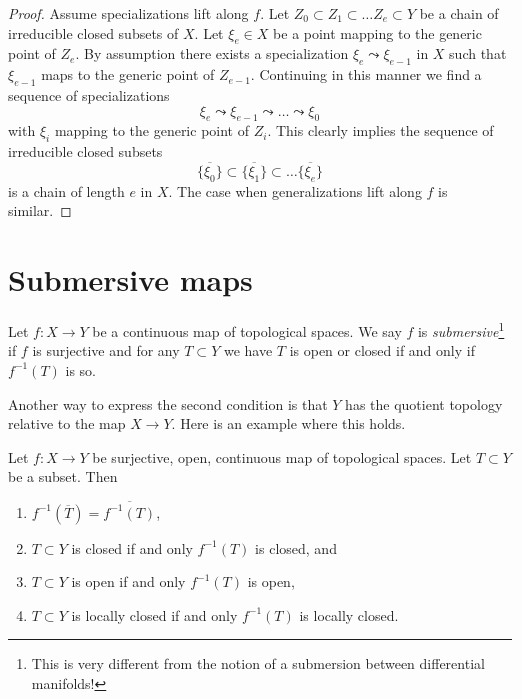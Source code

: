 \begin{proof}
Assume specializations lift along $f$.
Let $Z_0 \subset Z_1 \subset \ldots Z_e \subset Y$ be a chain
of irreducible closed subsets of $X$. Let $\xi_e \in X$ be a point
mapping to the generic point of $Z_e$. By assumption there
exists a specialization
$\xi_e \leadsto \xi_{e - 1}$ in $X$ such that $\xi_{e - 1}$ maps to
the generic point of $Z_{e - 1}$. Continuing in this manner we find
a sequence of specializations
$$
\xi_e \leadsto \xi_{e - 1} \leadsto \ldots \leadsto \xi_0
$$
with $\xi_i$ mapping to the generic point of $Z_i$.
This clearly implies the sequence of irreducible closed
subsets
$$
\overline{\{\xi_0\}} \subset
\overline{\{\xi_1\}} \subset \ldots
\overline{\{\xi_e\}}
$$
is a chain of length $e$ in $X$.
The case when generalizations lift along $f$ is similar.
\end{proof}





\section{Submersive maps}
\label{section-submersive}


\begin{definition}
\label{definition-submersive}
Let $f : X \to Y$ be a continuous map of topological spaces.
We say $f$ is {\it submersive}\footnote{This is very different from
the notion of a submersion between differential manifolds!}
if $f$ is surjective and for any $T \subset Y$ we have $T$ is
open or closed if and only if $f^{-1}(T)$ is so.
\end{definition}

\noindent
Another way to express the second condition is that $Y$ has the
quotient topology relative to the map $X \to Y$. Here is an example
where this holds.

\begin{lemma}
\label{lemma-open-morphism-quotient-topology}
Let $f : X \to Y$ be surjective, open, continuous map of topological spaces.
Let $T \subset Y$ be a subset. Then
\begin{enumerate}
\item $f^{-1}(\overline{T}) = \overline{f^{-1}(T)}$,
\item $T \subset Y$ is closed if and only $f^{-1}(T)$ is closed, and
\item $T \subset Y$ is open if and only $f^{-1}(T)$ is open,
\item $T \subset Y$ is locally closed if and only $f^{-1}(T)$ is locally closed.
\end{enumerate}
\end{lemma}

